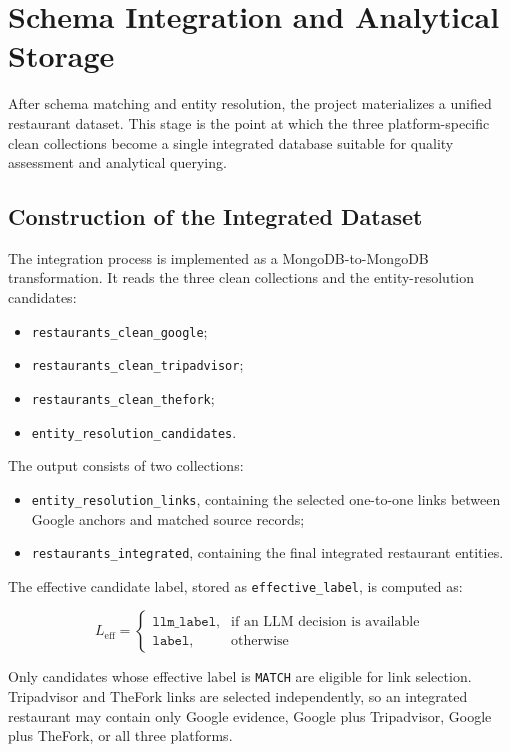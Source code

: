 \chapter{Schema Integration and Analytical Storage}

After schema matching and entity resolution, the project materializes a unified
restaurant dataset. This stage is the point at which the three platform-specific
clean collections become a single integrated database suitable for quality
assessment and analytical querying.

\section{Construction of the Integrated Dataset}

The integration process is implemented as a MongoDB-to-MongoDB transformation. It
reads the three clean collections and the entity-resolution candidates:

\begin{itemize}
    \item \texttt{restaurants\_clean\_google};
    \item \texttt{restaurants\_clean\_tripadvisor};
    \item \texttt{restaurants\_clean\_thefork};
    \item \texttt{entity\_resolution\_candidates}.
\end{itemize}

The output consists of two collections:

\begin{itemize}
    \item \texttt{entity\_resolution\_links}, containing the selected one-to-one
    links between Google anchors and matched source records;
    \item \texttt{restaurants\_integrated}, containing the final integrated
    restaurant entities.
\end{itemize}

The effective candidate label, stored as \texttt{effective\_label}, is computed as:

\[
L_{\mathrm{eff}} =
\begin{cases}
\texttt{llm\_label}, & \text{if an LLM decision is available}\\
\texttt{label}, & \text{otherwise}
\end{cases}
\]

Only candidates whose effective label is \texttt{MATCH} are eligible for link
selection. Tripadvisor and TheFork links are selected independently, so an
integrated restaurant may contain only Google evidence, Google plus Tripadvisor,
Google plus TheFork, or all three platforms.

